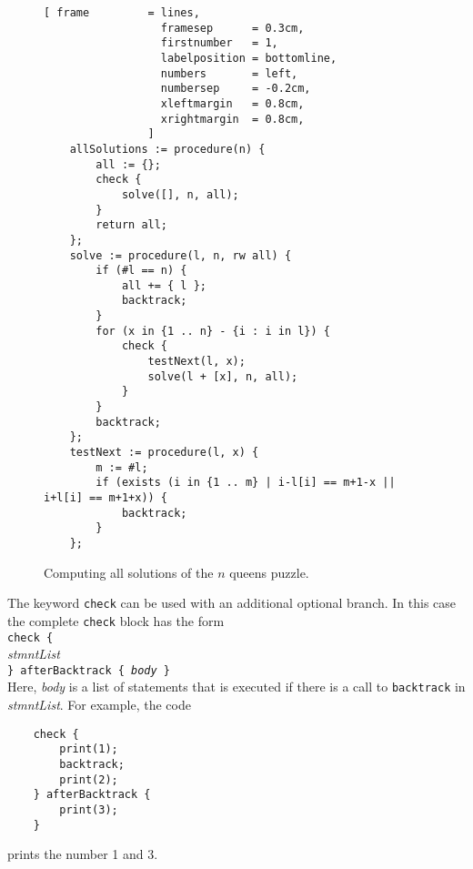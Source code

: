 \begin{figure}[!ht]
\centering
\begin{Verbatim}[ frame         = lines, 
                  framesep      = 0.3cm, 
                  firstnumber   = 1,
                  labelposition = bottomline,
                  numbers       = left,
                  numbersep     = -0.2cm,
                  xleftmargin   = 0.8cm,
                  xrightmargin  = 0.8cm,
                ]
    allSolutions := procedure(n) {
        all := {};
        check {
            solve([], n, all);
        }
        return all;
    };
    solve := procedure(l, n, rw all) { 
        if (#l == n) {
            all += { l };
            backtrack;
        }
        for (x in {1 .. n} - {i : i in l}) {
            check {
                testNext(l, x);
                solve(l + [x], n, all);
            } 
        }
        backtrack;
    };
    testNext := procedure(l, x) {
        m := #l;
        if (exists (i in {1 .. m} | i-l[i] == m+1-x || i+l[i] == m+1+x)) {
            backtrack;
        }
    };
\end{Verbatim}
\vspace*{-0.3cm}
\caption{Computing all solutions of the $n$ queens puzzle.}
\label{fig:queens-all.stlx}
\end{figure}
\vspace*{0.3cm}

The keyword \texttt{check} can be used with an additional optional branch.  In this case the
complete \texttt{check} block has the form
\\[0.2cm]
\hspace*{1.3cm}
\texttt{check \{} 
\\
\hspace*{1.8cm}
\textsl{stmntList}
\\
\hspace*{1.3cm}
\texttt{\} afterBacktrack \{ \textsl{body} \}}
\\[0.2cm]
Here, \textsl{body} is a list of statements that is executed if there is a call to \texttt{backtrack} in
\textsl{stmntList}.  For example, the code
\begin{verbatim}
    check { 
        print(1); 
        backtrack; 
        print(2); 
    } afterBacktrack { 
        print(3); 
    }
\end{verbatim}
prints the number 1 and 3.




